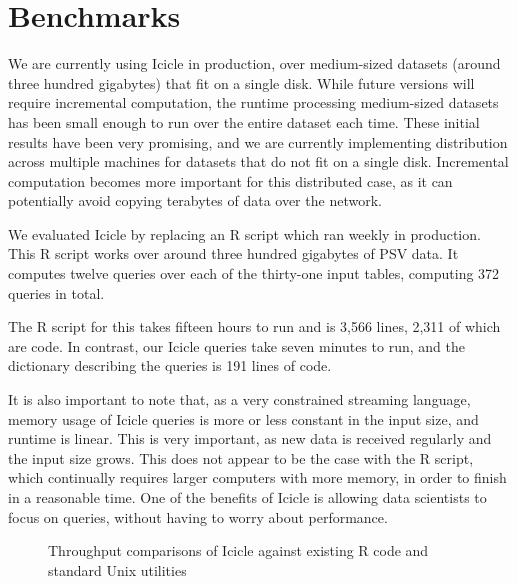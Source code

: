 \section{Benchmarks}
\label{s:Benchmarks}

We are currently using Icicle in production, over medium-sized datasets (around three hundred gigabytes) that fit on a single disk.
While future versions will require incremental computation, the runtime processing medium-sized datasets has been small enough to run over the entire dataset each time.
These initial results have been very promising, and we are currently implementing distribution across multiple machines for datasets that do not fit on a single disk.
Incremental computation becomes more important for this distributed case, as it can potentially avoid copying terabytes of data over the network.

We evaluated Icicle by replacing an R script which ran weekly in production.
This R script works over around three hundred gigabytes of PSV data.
It computes twelve queries over each of the thirty-one input tables, computing 372 queries in total.

The R script for this takes fifteen hours to run and is 3,566 lines, 2,311 of which are code.
In contrast, our Icicle queries take seven minutes to run, and the dictionary describing the queries is 191 lines of code.

It is also important to note that, as a very constrained streaming language, memory usage of Icicle queries is more or less constant in the input size, and runtime is linear.
This is very important, as new data is received regularly and the input size grows.
This does not appear to be the case with the R script, which continually requires larger computers with more memory, in order to finish in a reasonable time.
One of the benefits of Icicle is allowing data scientists to focus on queries, without having to worry about performance.

\begin{figure}


\caption{Throughput comparisons of Icicle against existing R code and standard Unix utilities}
\label{fig:bench:other}
\end{figure}


